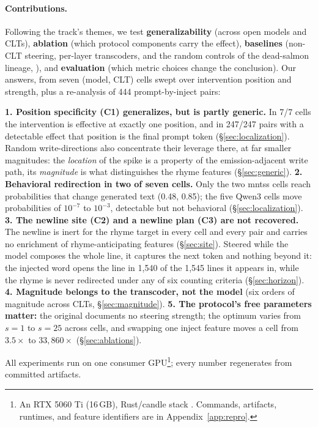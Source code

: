 \documentclass[11pt]{article}
\begin{document}
\paragraph{Contributions.}
Following the track's themes, we test \textbf{generalizability} (across open models and CLTs), \textbf{ablation} (which protocol components carry the effect), \textbf{baselines} (non-CLT steering, per-layer transcoders, and the random controls of the dead-salmon lineage, \citealp{meloux2025dead}), and \textbf{evaluation} (which metric choices change the conclusion). Our answers, from seven (model, CLT) cells swept over intervention position and strength, plus a re-analysis of 444 prompt-by-inject pairs:

\noindent\textbf{1. Position specificity (C1) generalizes, but is partly generic.} In 7/7 cells the intervention is effective at exactly one position, and in 247/247 pairs with a detectable effect that position is the final prompt token (\S\ref{sec:localization}). Random write-directions also concentrate their leverage there, at far smaller magnitudes: the \emph{location} of the spike is a property of the emission-adjacent write path, its \emph{magnitude} is what distinguishes the rhyme features (\S\ref{sec:generic}). \textbf{2. Behavioral redirection in two of seven cells.} Only the two mntss cells reach probabilities that change generated text (0.48, 0.85); the five Qwen3 cells move probabilities of $10^{-7}$ to $10^{-3}$, detectable but not behavioral (\S\ref{sec:localization}). \textbf{3. The newline site (C2) and a newline plan (C3) are not recovered.} The newline is inert for the rhyme target in every cell and every pair and carries no enrichment of rhyme-anticipating features (\S\ref{sec:site}). Steered while the model composes the whole line, it captures the next token and nothing beyond it: the injected word opens the line in 1{,}540 of the 1{,}545 lines it appears in, while the rhyme is never redirected under any of six counting criteria (\S\ref{sec:horizon}). \textbf{4. Magnitude belongs to the transcoder, not the model} (six orders of magnitude across CLTs, \S\ref{sec:magnitude}). \textbf{5. The protocol's free parameters matter:} the original documents no steering strength; the optimum varies from $s{=}1$ to $s{=}25$ across cells, and swapping one inject feature moves a cell from $3.5\times$ to $33{,}860\times$ (\S\ref{sec:ablations}).

All experiments run on one consumer GPU\footnote{An RTX 5060 Ti (16\,GB), Rust/candle stack \citep{candle2023,candlemi2026}. Commands, artifacts, runtimes, and feature identifiers are in Appendix~\ref{app:repro}.}; every number regenerates from committed artifacts.
\end{document}
